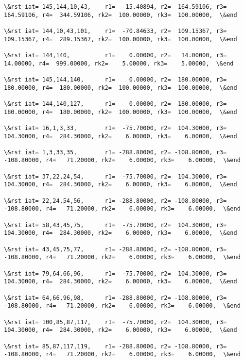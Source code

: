 \documentclass[11pt]{article}
\begin{document}
\begin{Verbatim}[commandchars=\\\{\}]
\&rst iat= 145,144,10,43,    r1=  -15.40894, r2=  164.59106, r3=  164.59106, r4=  344.59106, rk2=  100.00000, rk3=  100.00000,  \&end

\&rst iat= 144,10,43,101,    r1=  -70.84633, r2=  109.15367, r3=  109.15367, r4=  289.15367, rk2=  100.00000, rk3=  100.00000,  \&end

\&rst iat= 144,140,          r1=    0.00000, r2=   14.00000, r3=   14.00000, r4=  999.00000, rk2=    5.00000, rk3=    5.00000,  \&end

\&rst iat= 145,144,140,      r1=    0.00000, r2=  180.00000, r3=  180.00000, r4=  180.00000, rk2=  100.00000, rk3=  100.00000,  \&end

\&rst iat= 144,140,127,      r1=    0.00000, r2=  180.00000, r3=  180.00000, r4=  180.00000, rk2=  100.00000, rk3=  100.00000,  \&end

\&rst iat= 16,1,3,33,        r1=  -75.70000, r2=  104.30000, r3=  104.30000, r4=  284.30000, rk2=    6.00000, rk3=    6.00000,  \&end

\&rst iat= 1,3,33,35,        r1= -288.80000, r2= -108.80000, r3= -108.80000, r4=   71.20000, rk2=    6.00000, rk3=    6.00000,  \&end

\&rst iat= 37,22,24,54,      r1=  -75.70000, r2=  104.30000, r3=  104.30000, r4=  284.30000, rk2=    6.00000, rk3=    6.00000,  \&end

\&rst iat= 22,24,54,56,      r1= -288.80000, r2= -108.80000, r3= -108.80000, r4=   71.20000, rk2=    6.00000, rk3=    6.00000,  \&end

\&rst iat= 58,43,45,75,      r1=  -75.70000, r2=  104.30000, r3=  104.30000, r4=  284.30000, rk2=    6.00000, rk3=    6.00000,  \&end

\&rst iat= 43,45,75,77,      r1= -288.80000, r2= -108.80000, r3= -108.80000, r4=   71.20000, rk2=    6.00000, rk3=    6.00000,  \&end

\&rst iat= 79,64,66,96,      r1=  -75.70000, r2=  104.30000, r3=  104.30000, r4=  284.30000, rk2=    6.00000, rk3=    6.00000,  \&end

\&rst iat= 64,66,96,98,      r1= -288.80000, r2= -108.80000, r3= -108.80000, r4=   71.20000, rk2=    6.00000, rk3=    6.00000,  \&end

\&rst iat= 100,85,87,117,    r1=  -75.70000, r2=  104.30000, r3=  104.30000, r4=  284.30000, rk2=    6.00000, rk3=    6.00000,  \&end

\&rst iat= 85,87,117,119,    r1= -288.80000, r2= -108.80000, r3= -108.80000, r4=   71.20000, rk2=    6.00000, rk3=    6.00000,  \&end


\end{Verbatim}
\end{document}
